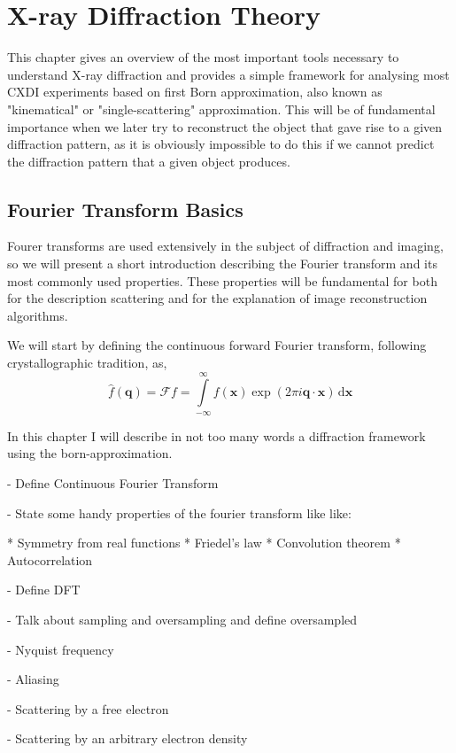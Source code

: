 \chapter{X-ray Diffraction Theory}\label{diffraction_theory}\noindent

This chapter gives an overview of the most important tools necessary to understand X-ray diffraction and provides a simple framework for analysing most CXDI experiments based on first Born approximation, also known as "kinematical" or "single-scattering" approximation. This will be of fundamental importance when we later try to reconstruct the object that gave rise to a given diffraction pattern, as it is obviously impossible to do this if we cannot predict the diffraction pattern that a given object produces.

\section{Fourier Transform Basics}\label{fourier_transform_basics}

Fourer transforms are used extensively in the subject of diffraction and imaging, so we will present a short introduction describing the Fourier transform and its most commonly used properties. These properties will be fundamental for both for the description scattering and for the explanation of image reconstruction algorithms.

We will start by defining the continuous forward Fourier transform, following crystallographic tradition, as,
\begin{equation}
\hat{f}({\mathbf q}) = \mathcal{F}f = \int \limits_{-\infty}^{\infty} f({\mathbf x}) \exp(2 \pi i
\mathbf{q \cdot x}) \, \mathrm{d} \mathbf{x}
\end{equation}

In this chapter I will describe in not too many words a diffraction framework
using the born-approximation.

- Define Continuous Fourier Transform 

- State some handy properties of the fourier transform like like:

* Symmetry from real functions
* Friedel's law 
* Convolution theorem
* Autocorrelation

- Define DFT

- Talk about sampling and oversampling and define oversampled

- Nyquist frequency

- Aliasing

- Scattering by a free electron

- Scattering by an arbitrary electron density
